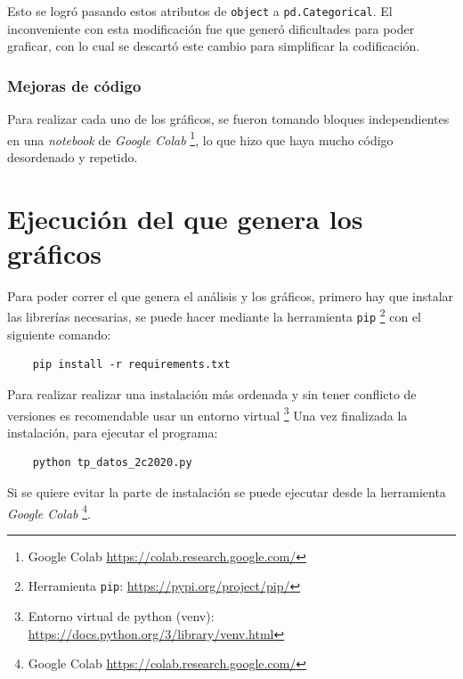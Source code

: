 \documentclass[titlepage,a4paper]{article}
\begin{document}
Esto se logró pasando estos atributos de \verb|object| a \verb|pd.Categorical|. El inconveniente con esta modificación fue que generó dificultades para poder graficar, con lo cual se descartó este cambio para simplificar la codificación.

\subsubsection{Mejoras de código}
Para realizar cada uno de los gráficos, se fueron tomando bloques independientes en una \textit{notebook} de \textit{Google Colab} \footnote{Google Colab \href{https://colab.research.google.com/}{https://colab.research.google.com/}}, lo que hizo que haya mucho código desordenado y repetido.

\newpage
\appendix
\section{Ejecución del  que genera los gráficos}
Para poder correr el  que genera el análisis y los gráficos, primero hay que instalar las librerías necesarias, se puede hacer mediante la herramienta \verb|pip| \footnote{Herramienta \verb|pip|: \href{https://pypi.org/project/pip/}{https://pypi.org/project/pip/}} con el siguiente comando:

\begin{verbatim}
    pip install -r requirements.txt
\end{verbatim}
Para realizar realizar una instalación más ordenada y sin tener conflicto de versiones es recomendable usar un entorno virtual \footnote{Entorno virtual de python (venv): \href{https://docs.python.org/3/library/venv.html}{https://docs.python.org/3/library/venv.html}}
Una vez finalizada la instalación, para ejecutar el programa:
\begin{verbatim}
    python tp_datos_2c2020.py
\end{verbatim}

Si se quiere evitar la parte de instalación se puede ejecutar desde la herramienta \textit{Google Colab} \footnote{Google Colab \href{https://colab.research.google.com/}{https://colab.research.google.com/}}.
\end{document}
